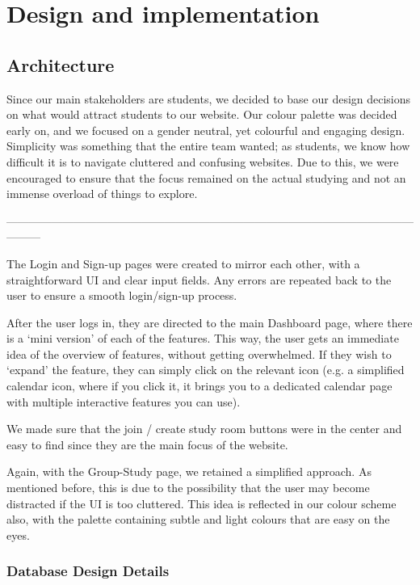 \chapter{Design and implementation}
\label{chap:design-and-implementation}

\section{Architecture}
\label{sect:architecture}

Since our main stakeholders are students, we decided to base our design decisions on what would attract students to our website. Our colour palette was decided early on, and we focused on a gender neutral, yet colourful and engaging design. Simplicity was something that the entire team wanted; as students, we know how difficult it is to navigate cluttered and confusing websites. Due to this, we were encouraged to ensure that the focus remained on the actual studying and not an immense overload of things to explore. 

---------------------------------------------------------------------------------------------------------------------

The Login and Sign-up pages were created to mirror each other, with a straightforward UI and clear input fields. Any errors are repeated back to the user to ensure a smooth login/sign-up process. 

After the user logs in, they are directed to the main Dashboard page, where there is a ‘mini version’ of each of the features. This way, the user gets an immediate idea of the overview of features, 
without getting overwhelmed. If they wish to ‘expand’ the feature, they can simply click on the relevant icon (e.g. a simplified calendar icon, where if you click it, it brings you to a dedicated calendar page with multiple interactive features you can use). 

We made sure that the join / create study room buttons were in the center and easy to find since they are the main focus of the website.

Again, with the Group-Study page, we retained a simplified approach. As mentioned before, this is due to the possibility that the user may become distracted if the UI is too cluttered. This idea is reflected in our colour scheme also, with the palette containing subtle and light colours that are easy on the eyes.


\subsection{Database Design Details}

